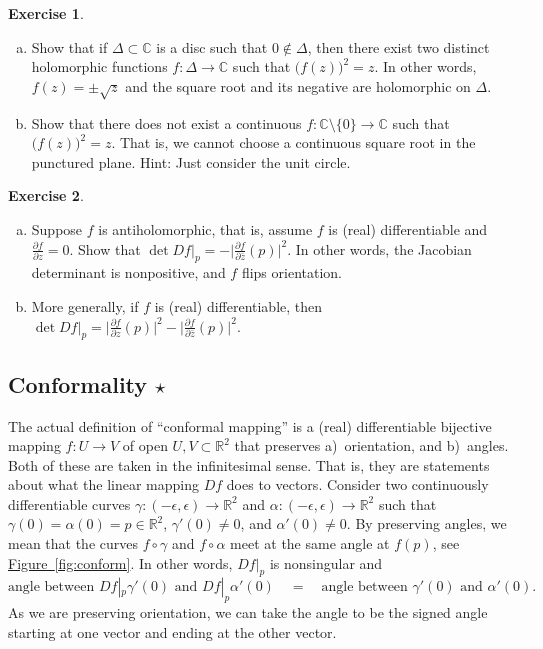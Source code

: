 \documentclass[12pt,openany]{book}
\newcommand{\babs}[1]{\bigl\lvert {#1} \bigr\rvert}
\newcommand{\C}{{\mathbb{C}}}
\newcommand{\R}{{\mathbb{R}}}
\newcommand{\myquote}[1]{``#1''}
\theoremstyle{plain}
\theoremstyle{remark}
\theoremstyle{definition}
\newenvironment{exbox}{%
    \def\FrameCommand{\vrule width 1pt \relax\hspace{10pt}}%
    \MakeFramed{\advance\hsize-\width\FrameRestore}%
}{%
    \endMakeFramed
}
\newenvironment{exparts}{%
    \leavevmode\begin{enumerate}[a),noitemsep,topsep=0pt,parsep=0pt,partopsep=0pt]
}{%
    \end{enumerate}
}
\theoremstyle{exercise}
\newtheorem{exercise}{Exercise}[section]
\theoremstyle{example}
\newcommand{\figureref}[1]{\hyperref[#1]{Figure~\ref*{#1}}}
\begin{document}
\begin{exbox}
\begin{exercise}
\begin{exparts}
\item
Show that if $\Delta \subset \C$ is a disc such that $0 \notin \Delta$, then
there exist two distinct holomorphic functions $f \colon \Delta \to \C$ such that
${\bigl(f(z)\bigr)}^2 = z$.  In other words, $f(z) = \pm \sqrt{z}$ and the
square root and its negative are holomorphic on $\Delta$.
\item
Show that there does not exist a continuous $f \colon \C \setminus \{ 0 \}
\to \C$ such that ${\bigl(f(z)\bigr)}^2 = z$.  That is, we cannot choose a
continuous square root in the punctured plane.  Hint: Just consider the unit
circle.
\end{exparts}
\end{exercise}

\begin{exercise}
\begin{exparts}
\item
Suppose $f$ is antiholomorphic, that is, assume $f$ is (real) differentiable
and $\frac{\partial f}{\partial z} = 0$.  Show that
$\det Df\big|_p = - \babs{\frac{\partial f}{\partial \bar{z}}(p)}^2$.  In other words,
the Jacobian determinant is nonpositive, and $f$ flips orientation.
\item
More generally, if $f$ is (real) differentiable, then
$\det Df\big|_p = \babs{\frac{\partial f}{\partial z}(p)}^2 -
\babs{\frac{\partial f}{\partial \bar{z}}(p)}^2$.
\end{exparts}
\end{exercise}
\end{exbox}

\subsection{Conformality \texorpdfstring{$\star$}{*}}

The actual definition of \myquote{conformal mapping} is 
a (real) differentiable bijective mapping $f \colon U \to V$ of open
$U, V \subset \R^2$ that preserves
a)~orientation, and b)~angles.
Both of these are taken in the infinitesimal sense.
That is, they are
statements about what the linear mapping $Df$ does to vectors.
Consider two continuously differentiable curves
$\gamma \colon (-\epsilon,\epsilon) \to \R^2$ and
$\alpha \colon (-\epsilon,\epsilon) \to \R^2$ such that
$\gamma(0)=\alpha(0) = p \in \R^2$,
$\gamma'(0) \neq 0$, and $\alpha'(0) \neq 0$.  By preserving angles, we
mean that the curves $f \circ \gamma$ and $f \circ \alpha$ meet at the same
angle at $f(p)$, see \figureref{fig:conform}.  In other words,
$Df|_p$ is nonsingular and
\begin{equation*}
\text{angle between } Df|_p \gamma'(0) \text{ and }
Df|_p \alpha'(0)
\quad = \quad
\text{angle between } \gamma'(0) \text{ and } \alpha'(0) .
\end{equation*}
As we are preserving orientation,
we can take the angle to be the signed angle starting at one vector and
ending at the other vector. 
\end{document}
